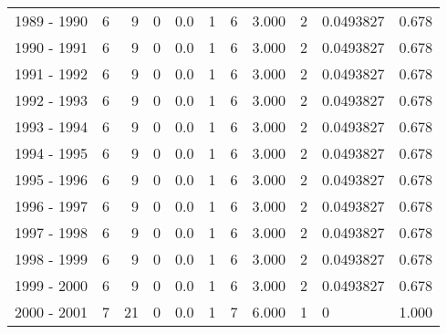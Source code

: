 \begin{tabular}{lrrrrrrrllr}
1989 - 1990 &        6 &        9 &                 0 &               0.0 &                       1 &                          6 &       3.000 &             2 &  0.0493827 &             0.678 \\
1990 - 1991 &        6 &        9 &                 0 &               0.0 &                       1 &                          6 &       3.000 &             2 &  0.0493827 &             0.678 \\
1991 - 1992 &        6 &        9 &                 0 &               0.0 &                       1 &                          6 &       3.000 &             2 &  0.0493827 &             0.678 \\
1992 - 1993 &        6 &        9 &                 0 &               0.0 &                       1 &                          6 &       3.000 &             2 &  0.0493827 &             0.678 \\
1993 - 1994 &        6 &        9 &                 0 &               0.0 &                       1 &                          6 &       3.000 &             2 &  0.0493827 &             0.678 \\
1994 - 1995 &        6 &        9 &                 0 &               0.0 &                       1 &                          6 &       3.000 &             2 &  0.0493827 &             0.678 \\
1995 - 1996 &        6 &        9 &                 0 &               0.0 &                       1 &                          6 &       3.000 &             2 &  0.0493827 &             0.678 \\
1996 - 1997 &        6 &        9 &                 0 &               0.0 &                       1 &                          6 &       3.000 &             2 &  0.0493827 &             0.678 \\
1997 - 1998 &        6 &        9 &                 0 &               0.0 &                       1 &                          6 &       3.000 &             2 &  0.0493827 &             0.678 \\
1998 - 1999 &        6 &        9 &                 0 &               0.0 &                       1 &                          6 &       3.000 &             2 &  0.0493827 &             0.678 \\
1999 - 2000 &        6 &        9 &                 0 &               0.0 &                       1 &                          6 &       3.000 &             2 &  0.0493827 &             0.678 \\
2000 - 2001 &        7 &       21 &                 0 &               0.0 &                       1 &                          7 &       6.000 &             1 &          0 &             1.000 \\

\end{tabular}
